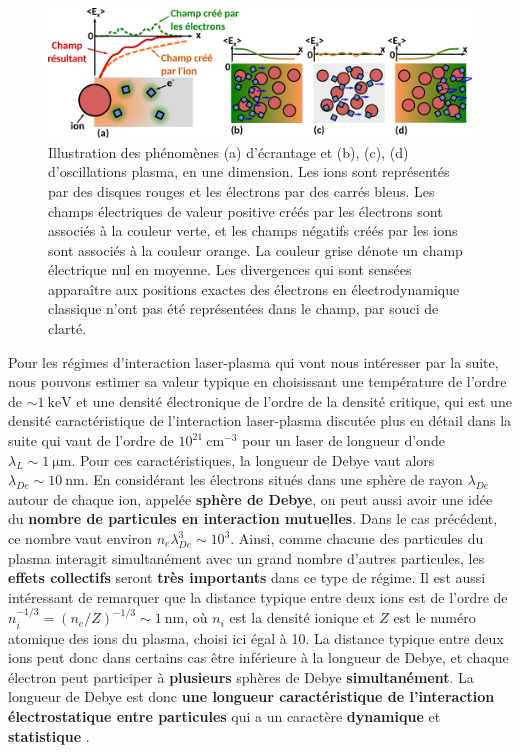 \begin{refsection}
\begin{figure}[hbtp]
    \centering
    \includegraphics[width=\linewidth]{2-laser/effets_plasma.png}
    \caption{Illustration des phénomènes (a) d'écrantage et (b), (c), (d) d'oscillations plasma, en une dimension. Les ions sont représentés par des disques rouges et les électrons par des carrés bleus. Les champs électriques de valeur positive créés par les électrons sont associés à la couleur verte, et les champs négatifs créés par les ions sont associés à la couleur orange. La couleur grise dénote un champ électrique nul en moyenne. Les divergences qui sont sensées apparaître aux positions exactes des électrons en électrodynamique classique n'ont pas été représentées dans le champ, par souci de clarté.}
    \label{fig:2-effets_plasma}
\end{figure}

Pour les régimes d'interaction laser-plasma qui vont nous intéresser par la suite, nous pouvons estimer sa valeur typique en choisissant une température de l'ordre de $\sim 1 ~ \si{\keV}$ et une densité électronique de l'ordre de la densité critique, qui est une densité caractéristique de l'interaction laser-plasma discutée plus en détail dans la suite qui vaut de l'ordre de $10^{21} ~ \si{\cm^{-3}}$ pour un laser de longueur d'onde $\lambda_L \sim 1 ~ \si{\um}$. Pour ces caractéristiques, la longueur de Debye vaut alors $\lambda_{De} \sim 10 ~ \si{\nm}$. En considérant les électrons situés dans une sphère de rayon $\lambda_{De}$ autour de chaque ion, appelée \textbf{sphère de Debye}, on peut aussi avoir une idée du \textbf{nombre de particules en interaction mutuelles}. 
Dans le cas précédent, ce nombre vaut environ $n_e \lambda_{De}^3 \sim 10^3$. Ainsi, comme chacune des particules du plasma interagit simultanément avec un grand nombre d'autres particules, les \textbf{effets collectifs} seront \textbf{très importants} dans ce type de régime. 
Il est aussi intéressant de remarquer que la distance typique entre deux ions est de l'ordre de $n_i^{-1/3} = (n_e/Z)^{-1/3} \sim 1 ~ \si{\nm}$, où $n_i$ est la densité ionique et $Z$ est le numéro atomique des ions du plasma, choisi ici égal à 10. La distance typique entre deux ions peut donc dans certains cas être inférieure à la longueur de Debye, et chaque électron peut participer à \textbf{plusieurs} sphères de Debye \textbf{simultanément}. La longueur de Debye est donc \textbf{une longueur caractéristique de l'interaction électrostatique entre particules} qui a un caractère \textbf{dynamique} et \textbf{statistique} \parencite{rax_2007}.


\end{refsection}
